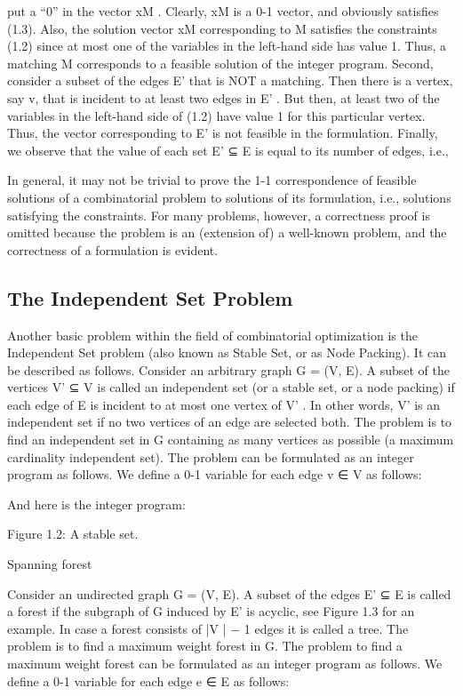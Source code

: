 \documentclass[titlepage]{book}
\begin{document}
put a “0” in the vector xM . Clearly, xM is a 0-1 vector, and obviously satisfies (1.3). Also, the solution
vector xM corresponding to M satisfies the constraints (1.2) since at most one of the variables in the
left-hand side has value 1. Thus, a matching M corresponds to a feasible solution of the integer program.
Second, consider a subset of the edges E' that is NOT a matching. Then there is a vertex, say v, that
is incident to at least two edges in E' . But then, at least two of the variables in the left-hand side of
(1.2) have value 1 for this particular vertex. Thus, the vector corresponding to E' is not feasible in the
formulation. Finally, we observe that the value of each set E' ⊆ E is equal to its number of edges, i.e.,


In general, it may not be trivial to prove the 1-1 correspondence of feasible solutions of a combinatorial
problem to solutions of its formulation, i.e., solutions satisfying the constraints. For many problems,
however, a correctness proof is omitted because the problem is an (extension of) a well-known problem,
and the correctness of a formulation is evident.

\subsection{The Independent Set Problem}

Another basic problem within the field of combinatorial optimization is the Independent Set problem
(also known as Stable Set, or as Node Packing). It can be described as follows.
Consider an arbitrary graph G = (V, E). A subset of the vertices V' ⊆ V is called an independent set
(or a stable set, or a node packing) if each edge of E is incident to at most one vertex of V' . In other
words, V' is an independent set if no two vertices of an edge are selected both. The problem is to find an
independent set in G containing as many vertices as possible (a maximum cardinality independent set).
The problem can be formulated as an integer program as follows. We define a 0-1 variable for each edge
v ∈ V as follows:

And here is the integer program:


Figure 1.2: A stable set.


Spanning forest

Consider an undirected graph G = (V, E). A subset of the edges E' ⊆ E is called a forest if the subgraph
of G induced by E' is acyclic, see Figure 1.3 for an example. In case a forest consists of |V | − 1 edges it
is called a tree. The problem is to find a maximum weight forest in G.
The problem to find a maximum weight forest can be formulated as an integer program as follows. We
define a 0-1 variable for each edge e ∈ E as follows:
\end{document}

